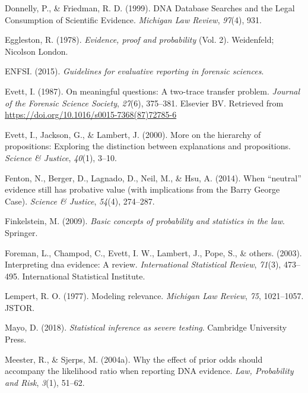 \documentclass[10pt,dvipsnames,enabledeprecatedfontcommands]{scrartcl}
\begin{document}
\leavevmode\hypertarget{ref-donnelly1999DNADatabaseSearches}{}%
Donnelly, P., \& Friedman, R. D. (1999). DNA Database Searches and the
Legal Consumption of Scientific Evidence. \emph{Michigan Law Review},
\emph{97}(4), 931.

\leavevmode\hypertarget{ref-eggleston1978evidence}{}%
Eggleston, R. (1978). \emph{Evidence, proof and probability} (Vol. 2).
Weidenfeld; Nicolson London.

\leavevmode\hypertarget{ref-enfs2015}{}%
ENFSI. (2015). \emph{Guidelines for evaluative reporting in forensic
sciences}.

\leavevmode\hypertarget{ref-Evett1987}{}%
Evett, I. (1987). On meaningful questions: A two-trace transfer problem.
\emph{Journal of the Forensic Science Society}, \emph{27}(6), 375--381.
Elsevier BV. Retrieved from
\url{https://doi.org/10.1016/s0015-7368(87)72785-6}

\leavevmode\hypertarget{ref-evett2000MoreHierarchyPropositions}{}%
Evett, I., Jackson, G., \& Lambert, J. (2000). More on the hierarchy of
propositions: Exploring the distinction between explanations and
propositions. \emph{Science \& Justice}, \emph{40}(1), 3--10.

\leavevmode\hypertarget{ref-fenton2014WhenNeutralEvidence}{}%
Fenton, N., Berger, D., Lagnado, D., Neil, M., \& Hsu, A. (2014). When
``neutral'' evidence still has probative value (with implications from
the Barry George Case). \emph{Science \& Justice}, \emph{54}(4),
274--287.

\leavevmode\hypertarget{ref-finkelstein2009basic}{}%
Finkelstein, M. (2009). \emph{Basic concepts of probability and
statistics in the law}. Springer.

\leavevmode\hypertarget{ref-foreman2003interpreting}{}%
Foreman, L., Champod, C., Evett, I. W., Lambert, J., Pope, S., \&
others. (2003). Interpreting dna evidence: A review. \emph{International
Statistical Review}, \emph{71}(3), 473--495. International Statistical
Institute.

\leavevmode\hypertarget{ref-lempert1977modeling}{}%
Lempert, R. O. (1977). Modeling relevance. \emph{Michigan Law Review},
\emph{75}, 1021--1057. JSTOR.

\leavevmode\hypertarget{ref-mayo2018}{}%
Mayo, D. (2018). \emph{Statistical inference as severe testing}.
Cambridge University Press.

\leavevmode\hypertarget{ref-meester2004WhyEffectPriora}{}%
Meester, R., \& Sjerps, M. (2004a). Why the effect of prior odds should
accompany the likelihood ratio when reporting DNA evidence. \emph{Law,
Probability and Risk}, \emph{3}(1), 51--62.
\end{document}
